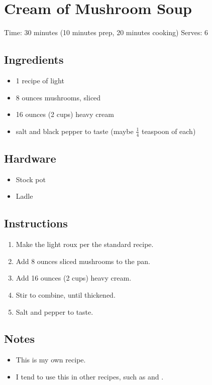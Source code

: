 \section{Cream of Mushroom Soup}
\label{creamOfMushroomSoup}
\setcounter{secnumdepth}{0}
Time: 30 minutes (10 minutes prep, 20 minutes cooking)
Serves: 6

\begin{multicols}{2}
\subsection*{Ingredients}
\begin{itemize}
    \item 1 recipe of light 
    \item 8 ounces mushrooms, sliced
    \item 16 ounces (2 cups) heavy cream
    \item salt and black pepper to taste (maybe \( \frac{1}{4} \) teaspoon of each)
\end{itemize}

\subsection*{Hardware}
\begin{itemize}
    \item Stock pot
    \item Ladle
\end{itemize}
\clearpage

\subsection*{Instructions}
\begin{enumerate}
    \item Make the light roux per the standard recipe.
    \item Add 8 ounces sliced mushrooms to the pan.
    \item Add 16 ounces (2 cups) heavy cream.
    \item Stir to combine, until thickened.
    \item Salt and pepper to taste. 
\end{enumerate}

\subsection*{Notes}
\begin{itemize}
    \item This is my own recipe.
    \item I tend to use this in other recipes, such as  and .
\end{itemize}
\end{multicols}
\clearpage
